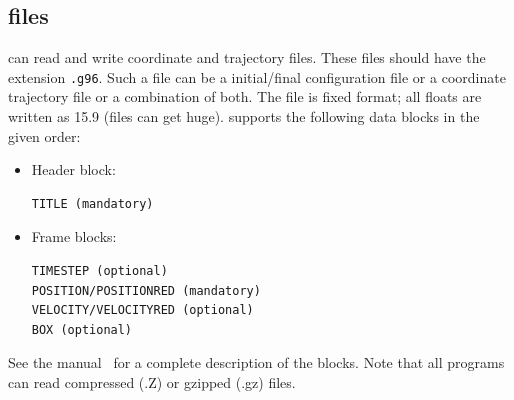 \subsection{ files}
{\gromacs} can read and write  coordinate and trajectory files.
These files should have the extension {\tt .g96}.
Such a file can be a  initial/final
configuration file or a coordinate trajectory file or a combination of both.
The file is fixed format; all floats are written as 15.9 (files can get huge).
{\gromacs} supports the following data blocks in the given order:
\begin{itemize}
\item Header block:
\begin{verbatim}
TITLE (mandatory)
\end{verbatim}
\item Frame blocks:
\begin{verbatim}
TIMESTEP (optional)
POSITION/POSITIONRED (mandatory)
VELOCITY/VELOCITYRED (optional)
BOX (optional)
\end{verbatim}
\end{itemize}
See the  manual~\cite{gromos96} for a complete description
of the blocks. Note that all {\gromacs} programs can read compressed
(.Z) or gzipped (.gz) files.
